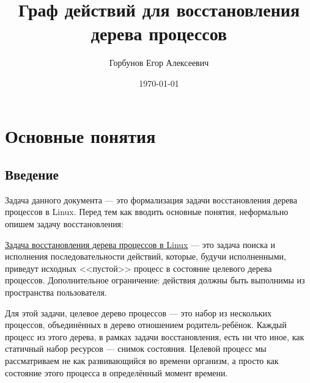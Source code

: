 

\title{Граф действий для восстановления дерева процессов}
\author{Горбунов Егор Алексеевич}
\date{\today}

\newcommand{\crcreate}[3]{\text{\textit{CreateAction}}(#1, #2, #3)}
\newcommand{\crshare}[4]{\text{\textit{ShareAction}}(#1, #2, #3, #4)}
\newcommand{\crinher}[2]{\text{\textit{InheritProperty}}(#1, #2)}
\newcommand{\crdependenices}[1]{\text{\textit{resourceDependencies}}(#1)}
\newcommand{\crremove}[3]{\text{\textit{RemoveAction}}(#1, #2, #3)}
\newcommand{\crfork}[3]{\text{\textit{ForkAction}}(#1, #2, #3)}
\newcommand{\isinherited}[1]{\text{\textit{isInherited}}(#1)}
\newcommand{\issharable}[1]{\text{\textit{isSharable}}(#1)}
\newcommand{\issignleton}[1]{\text{\textit{isSingle}}(#1)}
\newcommand{\possibleCreators}[2]{\text{\textit{possibleCreators}}(#1, #2)}
\newcommand{\canExistAtOnce}[2]{\text{\textit{canExistAtOnce}}(#1, #2)}
\newcommand{\resourceHolders}[2]{\text{\textit{resourceHolders}}(#1, #2)}




\maketitle

\section{Основные понятия}

\subsection{Введение}

Задача данного документа --- это формализация задачи восстановления дерева процессов в Linux. Перед тем как вводить основные понятия, неформально опишем задачу восстановления:

\underline{Задача восстановления дерева процессов в Linux} --- это задача поиска и исполнения последовательности действий, которые, будучи исполненными, приведут исходных <<пустой>> процесс в состояние целевого дерева процессов. Дополнительное ограничение: действия должны быть выполнимы из пространства пользователя.

Для этой задачи, целевое дерево процессов --- это набор из нескольких процессов, объединённых в дерево отношением родитель-ребёнок. Каждый процесс из этого дерева, в рамках задачи восстановления, есть ни что иное, как статичный набор ресурсов --- снимок состояния. Целевой процесс мы рассматриваем не как развивающийся во времени организм, а просто как состояние этого процесса в определённый момент времени.

